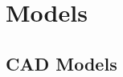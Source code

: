 \documentclass[../../main.tex]{subfiles}
\begin{document}
\chapter{Models}
\thispagestyle{fancy}













\section{CAD Models}
\blindtext
\end{document}

